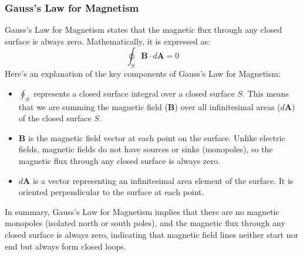 \subsubsection{Gauss's Law for Magnetism}
Gauss's Law for Magnetism states that the magnetic flux through any closed surface is always zero.
Mathematically, it is expressed as:
\[
\oint_S \mathbf{B} \cdot d\mathbf{A} = 0
\]
Here's an explanation of the key components of Gauss's Law for Magnetism:
\begin{itemize}
  \item $\oint_S$ represents a closed surface integral over a closed surface $S$. This means that we are summing the magnetic field ($\mathbf{B}$) over all infinitesimal areas ($d\mathbf{A}$) of the closed surface $S$.
  
  \item $\mathbf{B}$ is the magnetic field vector at each point on the surface. Unlike electric fields, magnetic fields do not have sources or sinks (monopoles), so the magnetic flux through any closed surface is always zero.
  
  \item $d\mathbf{A}$ is a vector representing an infinitesimal area element of the surface. It is oriented perpendicular to the surface at each point.
\end{itemize}

In summary, Gauss's Law for Magnetism implies that there are no magnetic monopoles (isolated north or south poles), and the magnetic flux through any closed surface is always zero, indicating that magnetic field lines neither start nor end but always form closed loops.


